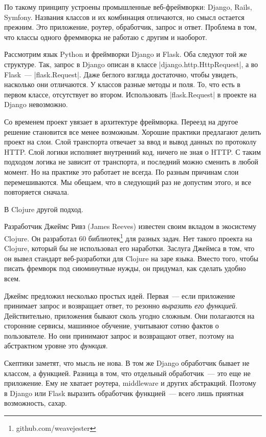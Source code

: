 По такому принципу устроены промышленные веб-фреймворки: Django, Rails,
Symfony. Названия классов и их комбинация отличаются, но смысл остается
прежним. Это приложение, роутер, обработчик, запрос и ответ. Проблема в том, что
классы одного фреммворка не работаю с другим и наоборот.

Рассмотрим язык Python и фреймворки Django и Flask. Оба следуют той же
структуре. Так, запрос в Django описан в классе \spverb|django.http.HttpRequest|,
а во Flask~--- \spverb|flask.Request|. Даже беглого взгляда достаточно,
чтобы увидеть, насколько они отличаются. У классов разные методы и поля.
То, что есть в первом классе, отсутствует во втором. Использовать \spverb|flask.Request|
в проекте на Django невозможно.

Со временем проект увязает в архитектуре фреймворка. Переезд на другое решение
становится все менее возможным. Хорошие практики предлагают делить проект на
слои. Слой транспорта отвечает за ввод и вывод данных по протоколу HTTP. Слой
логики исполняет внутренний код, ничего не зная о HTTP. С таким подходом логика
не зависит от транспорта, и последний можно сменить в любой момент. Но на
практике это работает не всегда. По разным причинам слои перемешиваются. Мы
обещаем, что в следующий раз не допустим этого, и все повторяется сначала.

В Clojure другой подход.

Разработчик Джеймс Ривз (James Reeves) известен своим вкладом в экосистему
Clojure. Он разработал 60 библиотек\footnote{github.com/weavejester} для разных
задач. Нет такого проекта на Clojure, который бы не использовал его
наработки. Заслуга Джеймса в том, что он вывел стандарт веб-разработки для
Clojure на заре языка. Вместо того, чтобы писать фремворк под сиюминутные нужды,
он придумал, как сделать удобно всем.

Джеймс предложил несколько простых идей. Первая~--- если приложение принимает
запрос и возвращает ответ, то резонно \emph{выразить его функцией}. Действительно,
приложения бывают сколь угодно сложным. Они полагаются на сторонние сервисы,
машинное обучение, учитывают сотню фактов о пользователе. Но они принимают
запрос и возвращают ответ, поэтому на абстрактном уровне это \emph{функция}.

Скептики заметят, что мысль не нова. В том же Django обработчик бывает
не классом, а функцией. Разница в том, что отдельный обработчик~--- это
еще не приложение. Ему не хватает роутера, middleware и других абстракций.
Поэтому в Django или Flask выразить обработчик функцией~--- всего лишь
приятная возможность, сахар.

